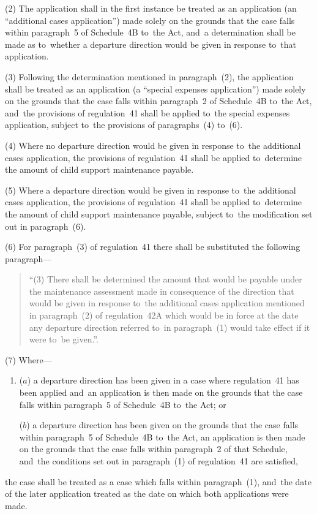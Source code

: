 \documentclass[12pt,a4paper]{article}
\begin{document}
(2) The application shall in the first instance be treated as an application (an “additional cases application”) made solely on the grounds that the case falls within paragraph~5 of Schedule~4B to~the Act, and~a determination shall be made as to~whether a departure direction would be given in response to~that application.

(3) Following the determination mentioned in paragraph~(2), the application shall be treated as an application (a “special expenses application”) made solely on the grounds that the case falls within paragraph~2 of Schedule~4B to~the Act, and~the provisions of regulation~41 shall be applied to~the special expenses application, subject to~the provisions of paragraphs~(4) to~(6).

(4) Where no departure direction would be given in response to~the additional cases application, the provisions of regulation~41 shall be applied to~determine the amount of child support maintenance payable.

(5) Where a departure direction would be given in response to~the additional cases application, the provisions of regulation~41 shall be applied to~determine the amount of child support maintenance payable, subject to~the modification set out in paragraph~(6).

(6) For paragraph~(3) of regulation~41 there shall be substituted the following paragraph—
\begin{quotation}
“(3) There shall be determined the amount that would be payable under the maintenance assessment made in consequence of the direction that would be given in response to~the additional cases application mentioned in paragraph~(2) of regulation~42A which would be in force at the date any departure direction referred to~in paragraph~(1) would take effect if it were to~be given.”.
\end{quotation}

(7) Where—
\begin{enumerate}\item[]
($a$) a departure direction has been given in a case where regulation~41 has been applied and~an application is then made on the grounds that the case falls within paragraph~5 of Schedule~4B to~the Act; or

($b$) a departure direction has been given on the grounds that the case falls within paragraph~5 of Schedule~4B to~the Act, an application is then made on the grounds that the case falls within paragraph~2 of that Schedule, and~the conditions set out in paragraph~(1) of regulation~41 are satisfied,
\end{enumerate}
the case shall be treated as a case which falls within paragraph~(1), and~the date of the later application treated as the date on which both applications were made.
\end{document}
